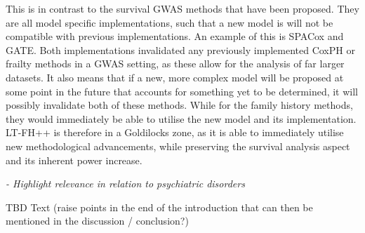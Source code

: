 This is in contrast to the survival GWAS methods that have been proposed. They are all model specific implementations, such that a new model is will not be compatible with previous implementations. An example of this is SPACox and GATE. Both implementations invalidated any previously implemented CoxPH or frailty methods in a GWAS setting, as these allow for the analysis of far larger datasets. It also means that if a new, more complex model will be proposed at some point in the future that accounts for something yet to be determined, it will possibly invalidate both of these methods. While for the family history methods, they would immediately be able to utilise the new model and its implementation. LT-FH++ is therefore in a Goldilocks zone, as it is able to immediately utilise new methodological advancements, while preserving the survival analysis aspect and its inherent power increase.    

{\itshape
- Highlight relevance in relation to psychiatric disorders
}

TBD Text (raise points in the end of the introduction that can then be mentioned in the discussion / conclusion?)